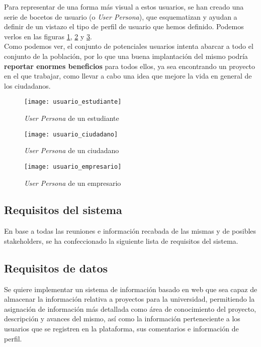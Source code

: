 Para representar de una forma más visual a estos usuarios, se han creado una serie de bocetos de usuario (o \textit{User Persona}), que esquematizan y ayudan a definir de un vistazo el tipo de perfil de usuario que hemos definido. Podemos verlos en las figuras \ref{usuario_estudiante}, \ref{usuario_ciudadano} y \ref{usuario_empresario}.\\

Como podemos ver, el conjunto de potenciales usuarios intenta abarcar a todo el conjunto de la población, por lo que una buena implantación del mismo podría \textbf{reportar enormes beneficios} para todos ellos, ya sea encontrando un proyecto en el que trabajar, como llevar a cabo una idea que mejore la vida en general de los ciudadanos.

\begin{figure}
    \centering
    \texttt{[image: usuario\_estudiante]}
    \caption{\textit{User Persona} de un estudiante}
    \label{usuario_estudiante}
\end{figure}

\begin{figure}
    \centering
    \texttt{[image: usuario\_ciudadano]}
    \caption{\textit{User Persona} de un ciudadano}
    \label{usuario_ciudadano}
\end{figure}

\begin{figure}
    \centering
    \texttt{[image: usuario\_empresario]}
    \caption{\textit{User Persona} de un empresario}
    \label{usuario_empresario}
\end{figure}

\subsection{Requisitos del sistema}
En base a todas las reuniones e información recabada de las mismas y de posibles stakeholders, se ha confeccionado la siguiente lista de requisitos del sistema.

\subsection*{Requisitos de datos}
Se quiere implementar un sistema de información basado en web que sea capaz de almacenar la información relativa a proyectos para la universidad, permitiendo la asignación de información más detallada como área de conocimiento del proyecto, descripción y avances del mismo, así como la información perteneciente a los usuarios que se registren en la plataforma, sus comentarios e información de perfil.

